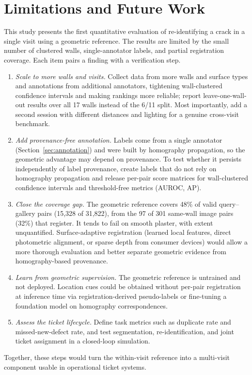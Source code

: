 \section{Limitations and Future Work}
\label{sec:limitations}

This study presents the first quantitative evaluation of re-identifying a crack in a single visit using a geometric reference.
The results are limited by the small number of clustered walls, single-annotator labels, and partial registration coverage.
Each item pairs a finding with a verification step.
\begin{enumerate}
\item \textit{Scale to more walls and visits.}
Collect data from more walls and surface types and annotations from additional annotators, tightening wall-clustered confidence intervals and making rankings more reliable; report leave-one-wall-out results over all 17 walls instead of the 6/11 split.
Most importantly, add a second session with different distances and lighting for a genuine cross-visit benchmark.
\item \textit{Add provenance-free annotation.}
Labels come from a single annotator (Section~\ref{sec:annotation}) and were built by homography propagation, so the geometric advantage may depend on provenance. To test whether it persists independently of label provenance, create labels that do not rely on homography propagation and release per-pair score matrices for wall-clustered confidence intervals and threshold-free metrics (AUROC, AP).
\item \textit{Close the coverage gap.}
The geometric reference covers 48\% of valid query--gallery pairs (15,328 of 31,822), from the 97 of 301 same-wall image pairs (32\%) that register. It tends to fail on smooth plaster, with extent unquantified.
Surface-adaptive registration (learned local features, direct photometric alignment, or sparse depth from consumer devices) would allow a more thorough evaluation and better separate geometric evidence from homography-based provenance.
\item \textit{Learn from geometric supervision.}
The geometric reference is untrained and not deployed.
Location cues could be obtained without per-pair registration at inference time via registration-derived pseudo-labels or fine-tuning a foundation model on homography correspondences.
\item \textit{Assess the ticket lifecycle.}
Define task metrics such as duplicate rate and missed-new-defect rate, and test segmentation, re-identification, and joint ticket assignment in a closed-loop simulation.
\end{enumerate}
Together, these steps would turn the within-visit reference into a multi-visit component usable in operational ticket systems.
